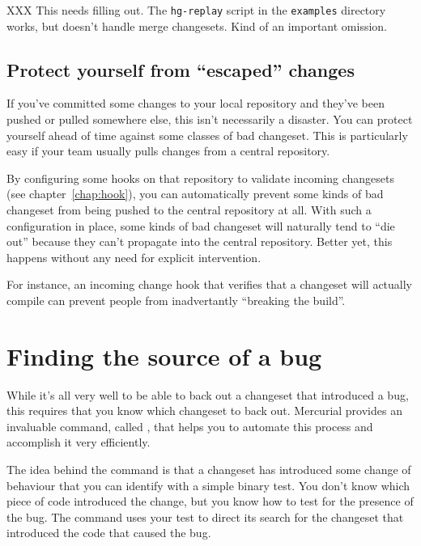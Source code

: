 XXX This needs filling out.  The \texttt{hg-replay} script in the
\texttt{examples} directory works, but doesn't handle merge
changesets.  Kind of an important omission.

\subsection{Protect yourself from ``escaped'' changes}

If you've committed some changes to your local repository and they've
been pushed or pulled somewhere else, this isn't necessarily a
disaster.  You can protect yourself ahead of time against some classes
of bad changeset.  This is particularly easy if your team usually
pulls changes from a central repository.

By configuring some hooks on that repository to validate incoming
changesets (see chapter~\ref{chap:hook}), you can automatically
prevent some kinds of bad changeset from being pushed to the central
repository at all.  With such a configuration in place, some kinds of
bad changeset will naturally tend to ``die out'' because they can't
propagate into the central repository.  Better yet, this happens
without any need for explicit intervention.

For instance, an incoming change hook that verifies that a changeset
will actually compile can prevent people from inadvertantly ``breaking
the build''.

\section{Finding the source of a bug}
\label{sec:undo:bisect}

While it's all very well to be able to back out a changeset that
introduced a bug, this requires that you know which changeset to back
out.  Mercurial provides an invaluable command, called
, that helps you to automate this process and accomplish
it very efficiently.

The idea behind the  command is that a changeset has
introduced some change of behaviour that you can identify with a
simple binary test.  You don't know which piece of code introduced the
change, but you know how to test for the presence of the bug.  The
 command uses your test to direct its search for the
changeset that introduced the code that caused the bug.

